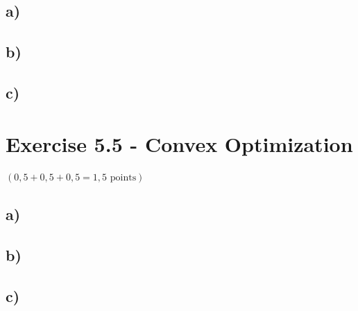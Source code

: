 \documentclass[a4paper]{article}
\begin{document}
    \subsection*{a)}
        
        
        
    \subsection*{b)}
        
        
        
    \subsection*{c)}
    
    



\newpage
\section*{Exercise 5.5 - Convex Optimization}
$(0,5+0,5+0,5 = 1,5 \text{ points})$
    \subsection*{a)}
        
        
        
    \subsection*{b)}
        
        
        
    \subsection*{c)}
        
    
    
\end{document}
